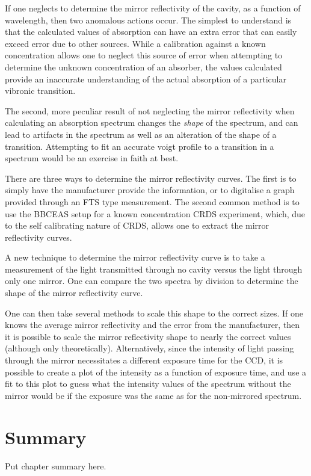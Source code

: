 If one neglects to determine the mirror reflectivity of the cavity, as a
function of wavelength, then two anomalous actions occur. The simplest to
understand is that the calculated values of absorption can have an extra error
that can easily exceed error due to other sources. While a calibration against
a known concentration allows one to neglect this source of error when
attempting to determine the unknown concentration of an absorber, the values
calculated provide an inaccurate understanding of the actual absorption of a
particular vibronic transition.

The second, more peculiar result of not neglecting the mirror reflectivity
when calculating an absorption spectrum changes the \emph{shape} of the
spectrum, and can lead to artifacts in the spectrum as well as an alteration
of the shape of a transition. Attempting to fit an accurate voigt profile to a
transition in a spectrum would be an exercise in faith at best.

There are three ways to determine the mirror reflectivity curves. The first is
to simply have the manufacturer provide the information, or to digitalise a
graph provided through an \ac{FTS} type measurement. The second common method
is to use the \ac{BBCEAS} setup for a known concentration \ac{CRDS}
experiment, which, due to the self calibrating nature of \ac{CRDS}, allows one
to extract the mirror reflectivity curves.

A new technique to determine the mirror reflectivity curve is to take a
measurement of the light transmitted through no cavity versus the light
through only one mirror. One can compare the two spectra by division to
determine the shape of the mirror reflectivity curve.

One can then take several methods to scale this shape to the correct sizes. If
one knows the average mirror reflectivity and the error from the manufacturer,
then it is possible to scale the mirror reflectivity shape to nearly the
correct values (although only theoretically). Alternatively, since the
intensity of light passing through the mirror necessitates a different
exposure time for the \ac{CCD}, it is possible to create a plot of the
intensity as a function of exposure time, and use a fit to this plot to guess
what the intensity values of the spectrum without the mirror would be if the
exposure was the same as for the non-mirrored spectrum.

\section{Summary}
Put chapter summary here.
